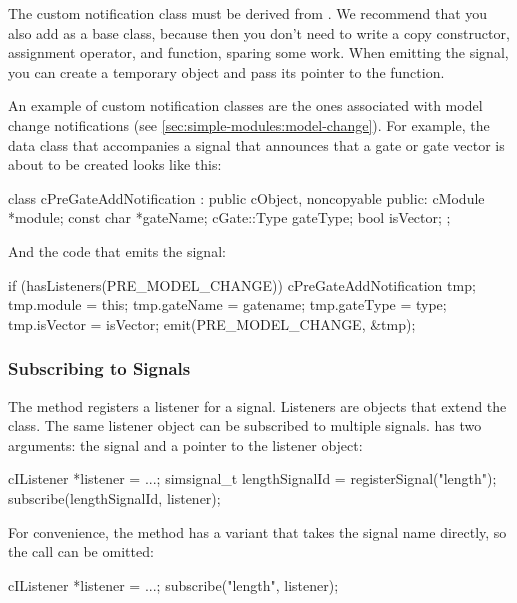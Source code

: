 The custom notification class must be derived from .
We recommend that you also add  as a base class, because
then you don't need to write a copy constructor, assignment operator, and
 function, sparing some work. When emitting the signal, you
can create a temporary object and pass its pointer to the 
function.

An example of custom notification classes are the ones associated with
model change notifications (see \ref{sec:simple-modules:model-change}).
For example, the data class that accompanies a signal that announces that a
gate or gate vector is about to be created looks like this:

\begin{cpp}
class cPreGateAddNotification : public cObject, noncopyable
{
  public:
    cModule *module;
    const char *gateName;
    cGate::Type gateType;
    bool isVector;
};
\end{cpp}

And the code that emits the signal:

\begin{cpp}
if (hasListeners(PRE_MODEL_CHANGE))
{
    cPreGateAddNotification tmp;
    tmp.module = this;
    tmp.gateName = gatename;
    tmp.gateType = type;
    tmp.isVector = isVector;
    emit(PRE_MODEL_CHANGE, &tmp);
}
\end{cpp}


\subsubsection{Subscribing to Signals}
\label{sec:simple-modules:subscribing-to-signals}

The  method registers a listener for a signal.
Listeners are objects that extend the  class.
The same listener object can be subscribed to multiple signals.
 has two arguments: the signal and a pointer to
the listener object:

\begin{cpp}
cIListener *listener = ...;
simsignal_t lengthSignalId = registerSignal("length");
subscribe(lengthSignalId, listener);
\end{cpp}

For convenience, the  method has a variant
that takes the signal name directly, so the 
call can be omitted:

\begin{cpp}
cIListener *listener = ...;
subscribe("length", listener);
\end{cpp}

